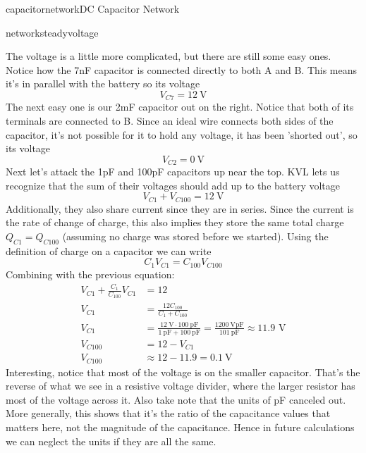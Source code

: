 \begin{mainquestion}{capacitornetwork}{DC Capacitor Network}
\begin{partquestion}{networksteadyvoltage}
\begin{answer}
The voltage is a little more complicated, but there are still some easy ones. Notice how the 7nF capacitor is connected directly to both A and B. This means it's in parallel with the battery so its voltage
\[V_{C7} = \qty{12}{\volt}\]
The next easy one is our 2mF capacitor out on the right. Notice that both of its terminals are connected to B. Since an ideal wire connects both sides of the capacitor, it's not possible for it to hold any voltage, it has been 'shorted out', so its voltage \[V_{C2} = \qty{0}{\volt}\]
Next let's attack the 1pF and 100pF capacitors up near the top. KVL lets us recognize that the sum of their voltages should add up to the battery voltage
\[V_{C1} + V_{C100} = \qty{12}{\volt}\]
Additionally, they also share current since they are in series. Since the current is the rate of change of charge, this also implies they store the same total charge $Q_{C1} = Q_{C100}$ (assuming no charge was stored before we started). Using the definition of charge on a capacitor we can write
\[C_1V_{C1}=C_{100}V_{C100}\]
Combining with the previous equation:
\begin{align*}
V_{C1} + \frac{C_{1}}{C_{100}}V_{C1} &= 12 \\
V_{C1} &= \frac{12C_{100}}{C_1 + C_{100}} \\
V_{C1} &= \frac{\qty{12}{\volt}\cdot\qty{100}{\pico\farad}}{\qty{1}{\pico\farad} + \qty{100}{\pico\farad}} = \frac{\qty{1200}{\volt\pico\farad}}{\qty{101}{\pico\farad}} \approx 11.9\text{ V} \\
V_{C100} &= 12 - V_{C1} \\
V_{C100} &\approx 12 - 11.9 = \qty{0.1}{\volt}
\end{align*}
Interesting, notice that most of the voltage is on the smaller capacitor. That's the reverse of what we see in a resistive voltage divider, where the larger resistor has most of the voltage across it. Also take note that the units of \unit{\pico\farad} canceled out. More generally, this shows that it's the ratio of the capacitance values that matters here, not the magnitude of the capacitance. Hence in future calculations we can neglect the units if they are all the same.


\end{answer}
\end{partquestion}
\end{mainquestion}
